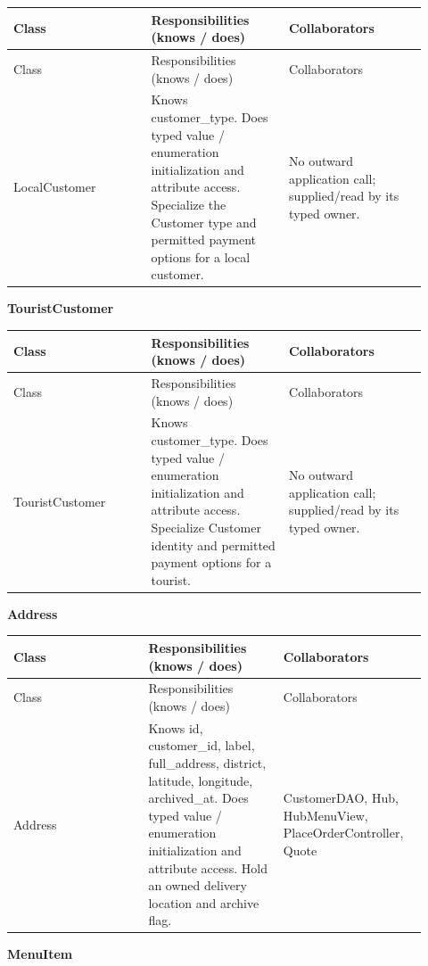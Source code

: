 \begin{longtable}{>{\raggedright\arraybackslash}p{0.3067\linewidth}>{\raggedright\arraybackslash}p{0.3067\linewidth}>{\raggedright\arraybackslash}p{0.3067\linewidth}}
Class & Responsibilities (knows / does) & Collaborators \\
\hline\endfirsthead
Class & Responsibilities (knows / does) & Collaborators \\
\hline\endhead
LocalCustomer & Knows customer\_type. Does typed value / enumeration initialization and attribute access. Specialize the Customer type and permitted payment options for a local customer. & No outward application call; supplied/read by its typed owner. \\
\end{longtable}
\textbf{TouristCustomer}

\begin{longtable}{>{\raggedright\arraybackslash}p{0.3067\linewidth}>{\raggedright\arraybackslash}p{0.3067\linewidth}>{\raggedright\arraybackslash}p{0.3067\linewidth}}
Class & Responsibilities (knows / does) & Collaborators \\
\hline\endfirsthead
Class & Responsibilities (knows / does) & Collaborators \\
\hline\endhead
TouristCustomer & Knows customer\_type. Does typed value / enumeration initialization and attribute access. Specialize Customer identity and permitted payment options for a tourist. & No outward application call; supplied/read by its typed owner. \\
\end{longtable}
\textbf{Address}

\begin{longtable}{>{\raggedright\arraybackslash}p{0.3067\linewidth}>{\raggedright\arraybackslash}p{0.3067\linewidth}>{\raggedright\arraybackslash}p{0.3067\linewidth}}
Class & Responsibilities (knows / does) & Collaborators \\
\hline\endfirsthead
Class & Responsibilities (knows / does) & Collaborators \\
\hline\endhead
Address & Knows id, customer\_id, label, full\_address, district, latitude, longitude, archived\_at. Does typed value / enumeration initialization and attribute access. Hold an owned delivery location and archive flag. & CustomerDAO, Hub, HubMenuView, PlaceOrderController, Quote \\
\end{longtable}
\textbf{MenuItem}

